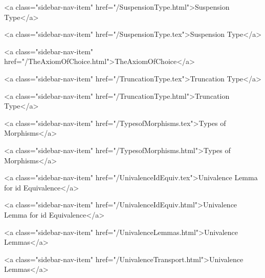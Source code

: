       
    
      
        
          <a class="sidebar-nav-item" href="/SuspensionType.html">Suspension Type</a>
        
      
    
      
        
          <a class="sidebar-nav-item" href="/SuspensionType.tex">Suspension Type</a>
        
      
    
      
        
          <a class="sidebar-nav-item" href="/TheAxiomOfChoice.html">TheAxiomOfChoice</a>
        
      
    
      
        
          <a class="sidebar-nav-item" href="/TruncationType.tex">Truncation Type</a>
        
      
    
      
        
          <a class="sidebar-nav-item" href="/TruncationType.html">Truncation Type</a>
        
      
    
      
        
          <a class="sidebar-nav-item" href="/TypesofMorphisms.tex">Types of Morphisms</a>
        
      
    
      
        
          <a class="sidebar-nav-item" href="/TypesofMorphisms.html">Types of Morphisms</a>
        
      
    
      
        
          <a class="sidebar-nav-item" href="/UnivalenceIdEquiv.tex">Univalence Lemma for id Equivalence</a>
        
      
    
      
        
          <a class="sidebar-nav-item" href="/UnivalenceIdEquiv.html">Univalence Lemma for id Equivalence</a>
        
      
    
      
        
          <a class="sidebar-nav-item" href="/UnivalenceLemmas.html">Univalence Lemmas</a>
        
      
    
      
        
          <a class="sidebar-nav-item" href="/UnivalenceTransport.html">Univalence Lemmas</a>
        
